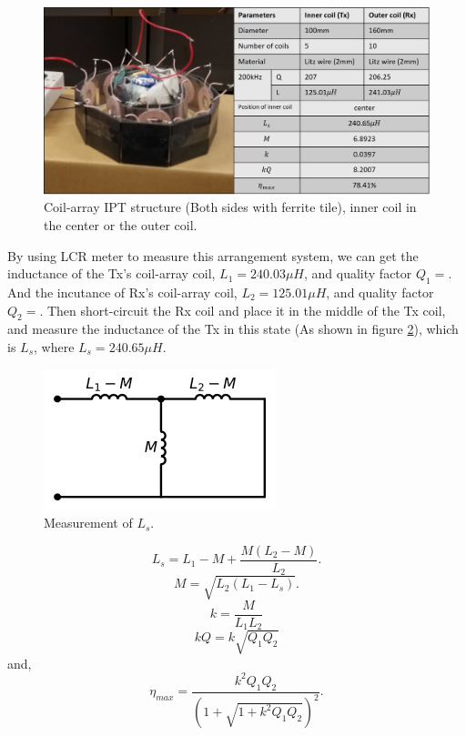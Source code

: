 \begin{figure}[!t]
    \centering
    \includegraphics[width=1.0\linewidth]{images/4_coil_5_10_with_ferrite.png}
    \caption{Coil-array IPT structure (Both sides with ferrite tile), inner coil in the center or the outer coil.}
    \label{fig: 10-5 with ferrite}
\end{figure}
By using LCR meter to measure this arrangement system, we can get the inductance of the Tx's coil-array coil, $L_1 = 240.03 \mu H$, and quality factor $Q_1=$. And the incutance of Rx's coil-array coil, $L_2 = 125.01 \mu H$, and quality factor $Q_2=$. Then short-circuit the Rx coil and place it in the middle of the Tx coil, and measure the inductance of the Tx in this state (As shown in figure \ref{fig: Ls}), which is $L_s$, where $L_s = 240.65 \mu H$.

\begin{figure}[!b]
    \centering
    \includegraphics{images/3_mutual_inductance.png}
    \caption{Measurement of $L_s$.}
    \label{fig: Ls}
\end{figure}

\begin{equation}
    L_s = L_1 - M + \frac{M(L_2 - M)}{L_2}.
\end{equation}
\begin{equation}
    M = \sqrt{L_2(L_1-L_s)}.
\end{equation}
\begin{equation}
    k = \frac{M}{L_1L_2}
\end{equation}
\begin{equation}
    kQ = k\sqrt{Q_1Q_2}
\end{equation}
and,
\begin{equation}
    \eta_{max} = \frac{k^2Q_1Q_2}{(1+\sqrt{1+k^2Q_1Q_2})^2}.
\end{equation}

